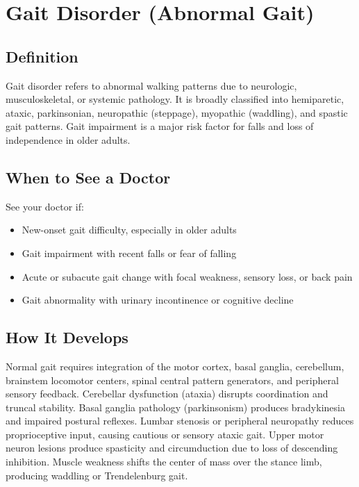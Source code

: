 \chapter{Gait Disorder (Abnormal Gait)}

\section*{Definition}
Gait disorder refers to abnormal walking patterns due to neurologic, musculoskeletal, or systemic pathology. It is broadly classified into hemiparetic, ataxic, parkinsonian, neuropathic (steppage), myopathic (waddling), and spastic gait patterns. Gait impairment is a major risk factor for falls and loss of independence in older adults.

\section*{When to See a Doctor}
See your doctor if:
\begin{itemize}
  \item New-onset gait difficulty, especially in older adults
  \item Gait impairment with recent falls or fear of falling
  \item Acute or subacute gait change with focal weakness, sensory loss, or back pain
  \item Gait abnormality with urinary incontinence or cognitive decline
\end{itemize}

\section*{How It Develops}
Normal gait requires integration of the motor cortex, basal ganglia, cerebellum, brainstem locomotor centers, spinal central pattern generators, and peripheral sensory feedback. Cerebellar dysfunction (ataxia) disrupts coordination and truncal stability. Basal ganglia pathology (parkinsonism) produces bradykinesia and impaired postural reflexes. Lumbar stenosis or peripheral neuropathy reduces proprioceptive input, causing cautious or sensory ataxic gait. Upper motor neuron lesions produce spasticity and circumduction due to loss of descending inhibition. Muscle weakness shifts the center of mass over the stance limb, producing waddling or Trendelenburg gait.

